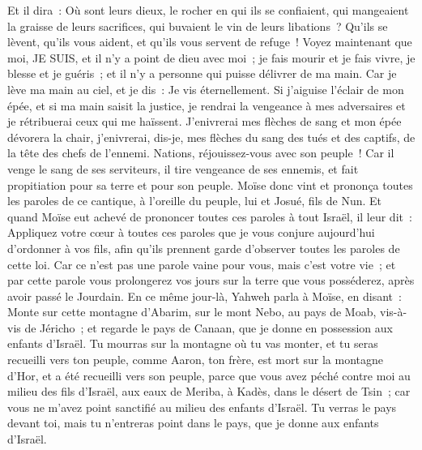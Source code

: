 \begin{multicols}{2}
Et il dira~: Où sont leurs dieux, le rocher en qui ils se confiaient,
qui mangeaient la graisse de leurs sacrifices, qui buvaient le vin de leurs libations~? Qu'ils se lèvent, qu'ils vous aident, et qu'ils vous servent de refuge~!
Voyez maintenant que moi, JE SUIS, et il n'y a point de dieu avec moi~; je fais mourir et je fais vivre, je blesse et je guéris~; et il n'y a personne qui puisse délivrer de ma main.
Car je lève ma main au ciel, et je dis~: Je vis éternellement.
Si j'aiguise l'éclair de mon épée, et si ma main saisit la justice, je rendrai la vengeance à mes adversaires et je rétribuerai ceux qui me haïssent.
 J'enivrerai mes flèches de sang et mon épée dévorera la chair, j'enivrerai, dis-je, mes flèches du sang des tués et des captifs, de la tête des chefs de l'ennemi.
Nations, réjouissez-vous avec son peuple~! Car il venge le sang de ses serviteurs, il tire vengeance de ses ennemis, et fait propitiation pour sa terre et pour son peuple.
Moïse donc vint et prononça toutes les paroles de ce cantique, à l'oreille du peuple, lui et Josué, fils de Nun.
Et quand Moïse eut achevé de prononcer toutes ces paroles à tout Israël,
il leur dit~: Appliquez votre cœur à toutes ces paroles que je vous conjure aujourd'hui d'ordonner à vos fils, afin qu'ils prennent garde d'observer toutes les paroles de cette loi.
Car ce n'est pas une parole vaine pour vous, mais c'est votre vie~; et par cette parole vous prolongerez vos jours sur la terre que vous posséderez, après avoir passé le Jourdain.
En ce même jour-là, Yahweh parla à Moïse, en disant~:
Monte sur cette montagne d'Abarim, sur le mont Nebo, au pays de Moab, vis-à-vis de Jéricho~; et regarde le pays de Canaan, que je donne en possession aux enfants d'Israël.
Tu mourras sur la montagne où tu vas monter, et tu seras recueilli vers ton peuple, comme Aaron, ton frère, est mort sur la montagne d'Hor, et a été recueilli vers son peuple,
parce que vous avez péché contre moi au milieu des fils d'Israël, aux eaux de Meriba, à Kadès, dans le désert de Tsin~; car vous ne m'avez point sanctifié au milieu des enfants d'Israël.
Tu verras le pays devant toi, mais tu n'entreras point dans le pays, que je donne aux enfants d'Israël.

\end{multicols}
